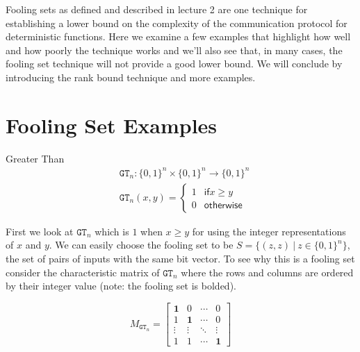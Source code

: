 \documentclass[usletter]{article}
\begin{document}

\noindent

Fooling sets as defined and described in lecture 2 are one technique for establishing a lower bound on the complexity of the communication protocol for deterministic functions. Here we examine a few examples that highlight how well and how poorly the technique works and we'll also see that, in many cases, the fooling set technique will not provide a good lower bound. We will conclude by introducing the rank bound technique and more examples.

\section{Fooling Set Examples} \label{sec:fooling-set-eg}

\begin{example}
  Greater Than
  \begin{align*}
    & \mathtt{GT}_n : \{0,1\}^n \times \{0,1\}^n \rightarrow \{0,1\}^n \\
    & \mathtt{GT}_n(x,y) = \left \{
      \begin{array}{ll}
        1  & \mathsf{if} x \geq y \\
        0 & \mathsf{otherwise}
        \end{array}
      \right.
  \end{align*}
\end{example}

First we look at $\mathtt{GT}_n$ which is $1$ when $x \geq y$ for using the integer representations of $x$ and $y$. We can easily choose the fooling set to be $S = \{ (z, z)\ |\ z \in \{0,1\}^n \}$, the set of pairs of inputs with the same bit vector. To see why this is a fooling set consider the characteristic matrix of $\mathtt{GT}_n$ where the rows and columns are ordered by their integer value (note: the fooling set is bolded).

\begin{equation*}
  M_{\mathtt{GT}_n} =
  \begin{bmatrix}
  \textbf{1} & 0 & \cdots & 0 \\
  1 & \textbf{1} & \cdots & 0 \\
  \vdots & \vdots & \ddots & \vdots \\
  1 & 1 & \cdots & \textbf{1}
  \end{bmatrix}
\end{equation*}
\end{document}
